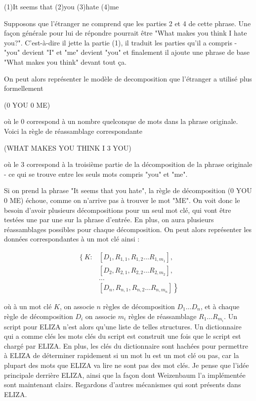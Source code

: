 \documentclass[11pt,a4paper]{report}
\begin{document}
  \begin{center}
    (1)It seems that (2)you (3)hate (4)me
  \end{center} 
  
  Supposons que l'étranger ne comprend que les parties 2 et 4 de cette phrase. Une façon générale 
  pour lui de répondre pourrait être "What makes you think I hate you?". C'est-à-dire il jette la partie (1), 
  il traduit les parties qu'il a compris - "you" devient "I" et "me" devient "you" et finalement il 
  ajoute une phrase de base "What makes you think" devant tout ça. 

  On peut alors représenter le modèle de decomposition que l'étranger a utilisé plus formellement 

  \begin{center}
    (0 YOU 0 ME)
  \end{center} 

  où le 0 correspond à un nombre quelconque de mots dans la phrase originale. 
  Voici la règle de réassamblage correspondante

  \begin{center}
    (WHAT MAKES YOU THINK I 3 YOU)
  \end{center} 
  
  où le 3 correspond à la troisième partie de la décomposition de la phrase originale 
  - ce qui se trouve entre les seuls mots compris "you" et "me". 
   
  Si on prend la phrase "It seems that you hate", la règle de décomposition 
  (0 YOU 0 ME) échoue, comme on n'arrive pas à trouver le mot "ME". On voit donc le 
  besoin d'avoir plusieurs décompositions pour un seul mot clé, qui vont être testées 
  une par une sur la phrase d'entrée. En plus, on aura plusieurs réassamblages possibles pour 
  chaque décomposition. On peut alors représenter les données correspondantes à un mot clé 
  ainsi : 

  \begin{align*}
    \left\{ K: \right. 
    &\left[ D_{1}, R_{1, 1}, R_{1, 2} \ldots R_{1, m_{1}} \right], \\
    &\left[ D_{2}, R_{2, 1}, R_{2, 2} \ldots R_{2, m_{2}} \right], \\
    &\ldots \\
    &\left. \left[ D_{n}, R_{n, 1}, R_{n, 2} \ldots R_{n, m_{n}} \right] \right\}
  \end{align*}

  où à un mot clé $K$, on associe $n$ règles de décomposition $D_{1} \ldots D_{n}$, et à 
  chaque règle de décomposition $D_{i}$ on associe $m_{i}$ règles de réassamblage 
  $R_{1} \ldots R_{m_{i}}$. Un script pour ELIZA 
  n'est alors qu'une liste de telles structures. Un dictionnaire qui a comme clés 
  les mots clés du script est construit une fois que le script est chargé par ELIZA. 
  En plus, les clés du dictionnaire sont hachées pour permettre à ELIZA de déterminer 
  rapidement si un mot lu est un mot clé ou pas, car la plupart des mots que ELIZA va lire 
  ne sont pas des mot clés. Je pense que l'idée principale derrière ELIZA, ainsi 
  que la façon dont Weizenbaum l'a implémentée sont maintenant clairs. Regardons 
  d'autres mécanismes qui sont présents dans ELIZA.
\end{document}
